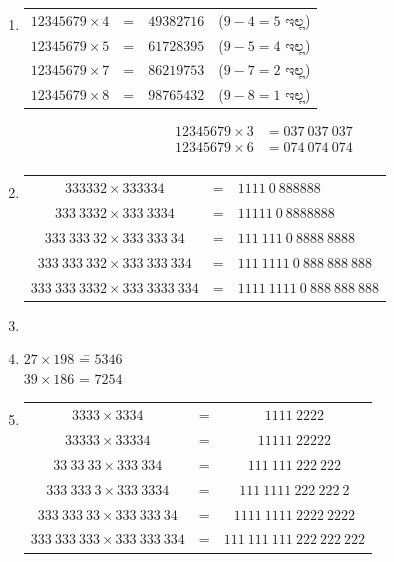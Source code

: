 \begin{enumerate}
\item 
\begin{tabular}[t]{l@{\;}l@{\;}ll}
$12345679\times 4$ & = & $49382716$ & ($9-4 = 5$ ಇಲ್ಲ)\\
$12345679\times 5$ & = & $61728395$ & ($9-5 = 4$ ಇಲ್ಲ)\\
$12345679\times 7$ & = & $86219753$ & ($9-7 = 2$ ಇಲ್ಲ)\\
$12345679\times 8$ & = & $98765432$ & ($9-8 = 1$ ಇಲ್ಲ)
\end{tabular}
\begin{align*}
12345679\times 3 & = 037~037~037\\
12345679\times 6 & = 074~074~074\\ 
\end{align*}

\item 
\begin{tabular}[t]{c@{\;}c@{\;}l}
$333332\times 333334$ & = & $1111~0~888888$\\
$333~3332\times 333~3334$ & = & $11111~0~8888888$\\
$333~333~32\times 333~333~34$ & = & $111~111~0~8888~8888$\\
$333~333~332\times 333~333~334$ & = & $111~1111~0~888~888~888$\\
$333~333~3332\times 333~3333~334$ & = & $1111~1111~0~888~888~888$\\
\end{tabular}

\item 
{\fontsize{10.3}{11.6}}

\item 
\begin{tabbing}
$27\times 198$ \= = $5346$\\
$39\times 186$ \> = $7254$
\end{tabbing}

\item 
\begin{tabular}[t]{c@{\;}c@{\;}c}
$3333\times 3334$ & = & $1111~2222$\\
$33333\times 33334$ & = & $11111~22222$\\
$33~33~33\times 333~334$ & = & $111~111~222~222$\\
$333~333~3\times 333~3334$ & = & $111~1111~222~222~2$\\
$333~333~33\times 333~333~34$ & = & $1111~1111~2222~2222$\\
$333~333~333\times 333~333~334$ & = & $111~111~111~222~222~222$\\
\end{tabular}


\end{enumerate}
